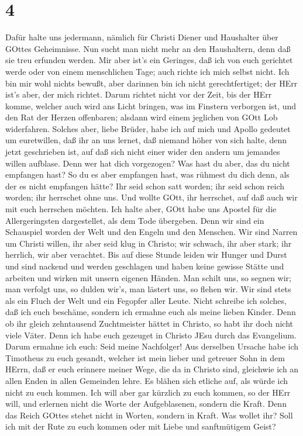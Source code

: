 \hypertarget{section-3}{%
\section{4}\label{section-3}}

 Dafür halte uns jedermann, nämlich für Christi Diener und
Haushalter über GOttes Geheimnisse.  Nun sucht man nicht
mehr an den Haushaltern, denn daß sie treu erfunden werden. 
Mir aber ist's ein Geringes, daß ich von euch gerichtet werde oder von
einem menschlichen Tage; auch richte ich mich selbst nicht. 
Ich bin mir wohl nichts bewußt, aber darinnen bin ich nicht
gerechtfertiget; der HErr ist's aber, der mich richtet. 
Darum richtet nicht vor der Zeit, bis der HErr komme, welcher auch wird
ans Licht bringen, was im Finstern verborgen ist, und den Rat der Herzen
offenbaren; alsdann wird einem jeglichen von GOtt Lob widerfahren.
 Solches aber, liebe Brüder, habe ich auf mich und Apollo
gedeutet um euretwillen, daß ihr an uns lernet, daß niemand höher von
sich halte, denn jetzt geschrieben ist, auf daß sich nicht einer wider
den andern um jemandes willen aufblase.  Denn wer hat dich
vorgezogen? Was hast du aber, das du nicht empfangen hast? So du es aber
empfangen hast, was rühmest du dich denn, als der es nicht empfangen
hätte?  Ihr seid schon satt worden; ihr seid schon reich
worden; ihr herrschet ohne uns. Und wollte GOtt, ihr herrschet, auf daß
auch wir mit euch herrschen möchten.  Ich halte aber, GOtt
habe uns Apostel für die Allergeringsten dargestellet, als dem Tode
übergeben. Denn wir sind ein Schauspiel worden der Welt und den Engeln
und den Menschen.  Wir sind Narren um Christi willen, ihr
aber seid klug in Christo; wir schwach, ihr aber stark; ihr herrlich,
wir aber verachtet.  Bis auf diese Stunde leiden wir Hunger
und Durst und sind nackend und werden geschlagen und haben keine gewisse
Stätte  und arbeiten und wirken mit unsern eigenen Händen.
Man schilt uns, so segnen wir; man verfolgt uns, so dulden wir's, man
lästert uns, so flehen wir.  Wir sind stets als ein Fluch
der Welt und ein Fegopfer aller Leute.  Nicht schreibe ich
solches, daß ich euch beschäme, sondern ich ermahne euch als meine
lieben Kinder.  Denn ob ihr gleich zehntausend Zuchtmeister
hättet in Christo, so habt ihr doch nicht viele Väter. Denn ich habe
euch gezeuget in Christo JEsu durch das Evangelium.  Darum
ermahne ich euch: Seid meine Nachfolger!  Aus derselben
Ursache habe ich Timotheus zu euch gesandt, welcher ist mein lieber und
getreuer Sohn in dem HErrn, daß er euch erinnere meiner Wege, die da in
Christo sind, gleichwie ich an allen Enden in allen Gemeinden lehre.
 Es blähen sich etliche auf, als würde ich nicht zu euch
kommen.  Ich will aber gar kürzlich zu euch kommen, so der
HErr will, und erlernen nicht die Worte der Aufgeblasenen, sondern die
Kraft.  Denn das Reich GOttes stehet nicht in Worten,
sondern in Kraft.  Was wollet ihr? Soll ich mit der Rute zu
euch kommen oder mit Liebe und sanftmütigem Geist?

